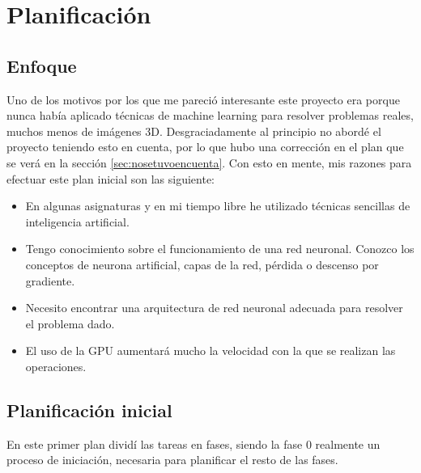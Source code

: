\chapter{Planificaci\'on}\label{planinicial}

\section{Enfoque}\label{sec:enfoque}

Uno de los motivos por los que me pareció interesante este proyecto era porque nunca había aplicado técnicas de machine learning para resolver problemas reales, muchos menos de imágenes 3D. Desgraciadamente al principio no abordé el proyecto teniendo esto en cuenta, por lo que hubo una corrección en el plan que se verá en la sección \ref{sec:nosetuvoencuenta}.
Con esto en mente, mis razones para efectuar este plan inicial son las siguiente:

\begin{itemize}
\item En algunas asignaturas y en mi tiempo libre he utilizado técnicas sencillas de inteligencia artificial.
\item Tengo conocimiento sobre el funcionamiento de una red neuronal. Conozco los conceptos de neurona artificial, capas de la red, pérdida o descenso por gradiente.
\item Necesito encontrar una arquitectura de red neuronal adecuada para resolver el problema dado.
\item El uso de la GPU aumentará mucho la velocidad con la que se realizan las operaciones.
\end{itemize}

\section{Planificación inicial}\label{sec:planinicial}

En este primer plan dividí las tareas en fases, siendo la fase 0 realmente un proceso de iniciación, necesaria para planificar el resto de las fases.

